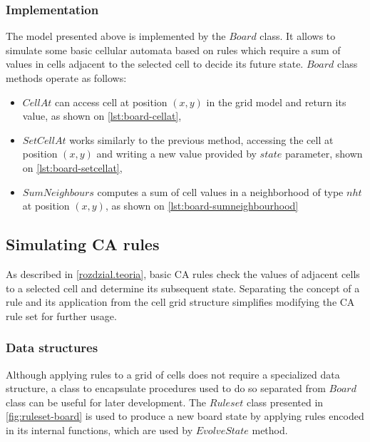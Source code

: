 \documentclass[12pt]{report}
\begin{document}
\subsubsection{Implementation}
 
The model presented above is implemented by the $Board$ class. It allows to simulate some basic cellular automata based on rules which require a sum of values in cells adjacent to the selected cell to decide its future state. $Board$ class methods operate as follows:

\begin{itemize}
	\item $CellAt$ can access cell at position $(x,y)$ in the grid model and return its value, as shown on \cref{lst:board-cellat},
	\item $SetCellAt$ works similarly to the previous method, accessing the cell at position $(x,y)$ and writing a new value provided by $state$ parameter, shown on \cref{lst:board-setcellat},
	\item $SumNeighbours$ computes a sum of cell values in a neighborhood of type $nht$ at position $(x,y)$, as shown on \cref{lst:board-sumneighbourhood} 
\end{itemize}
 





\subsection{Simulating CA rules} 

As described in \cref{rozdzial.teoria}, basic CA rules check the values of adjacent cells to a selected cell and determine its subsequent state. Separating the concept of a rule and its application from the cell grid structure simplifies modifying the CA rule set for further usage.

\subsubsection{Data structures}

Although applying rules to a grid of cells does not require a specialized data structure, a class to encapsulate procedures used to do so separated from $Board$ class can be useful for later development. The $Ruleset$ class presented in \cref{fig:ruleset-board} is used to produce a new board state by applying rules encoded in its internal functions, which are used by $EvolveState$ method.
\end{document}
